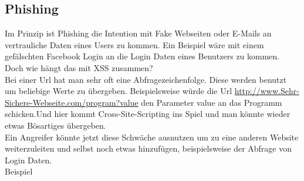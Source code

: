 \subsection{Phishing}
\label{sec:xss_phishing}
Im Prinzip ist Phishing die Intention mit Fake Webseiten oder E-Mails an vertrauliche Daten eines Users zu kommen. Ein Beispiel wäre mit einem gefälschten Facebook Login an die Login Daten eines Benutzers zu kommen. 
\\Doch wie hängt das mit XSS zusammen?\\Bei einer Url hat man sehr oft eine Abfragezeichenfolge. Diese werden benutzt um beliebige Werte zu übergeben. Beispielsweise würde die Url 
\url{ http://www.Sehr-Sichere-Webseite.com/program?value} den Parameter value an das Programm schicken.Und hier kommt Cross-Site-Scripting ins Spiel und man könnte wieder etwas Bösartiges übergeben.\\Ein Angreifer könnte jetzt diese Schwäche ausnutzen um zu eine anderen Website weiterzuleiten und selbst noch etwas hinzufügen, beispielsweise der Abfrage von Login Daten. \\Beispiel\\
